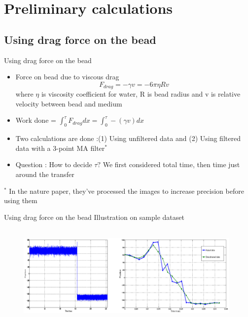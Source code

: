 \documentclass{beamer}
\begin{document}
\section{Preliminary calculations}
\subsection{Using drag force on the bead}
\begin{frame}{Using drag force on the bead}

\begin{itemize}

\item Force on bead due to viscous drag
\begin{equation*}
F_{drag}= -\gamma v = -6 \pi \eta R v
\end{equation*}
where $\eta$ is viscosity coefficient for water, R is bead radius and v is relative velocity between bead and medium
\item Work done = $\int_{0}^{\tau} F_{drag}dx = \int_{0}^{\tau} -(\gamma v) dx $
\item Two calculations are done :(1) Using unfiltered data and (2) Using filtered data with a 3-point MA filter$^{*}$
\item Question : How to decide $\tau ?$ We first considered total time, then time just around the transfer

\end{itemize}
${^*}$ \small{In the nature paper, they've processed the images to increase precision before using them}
\end{frame}

\begin{frame}{Using drag force on the bead}
Illustration on sample dataset
\begin{figure}
    \centering
    \includegraphics[height=5cm,width=11cm]{work_done_fig1.eps}
    \label{fig:graph6}
\end{figure}

\end{frame}
\end{document}
